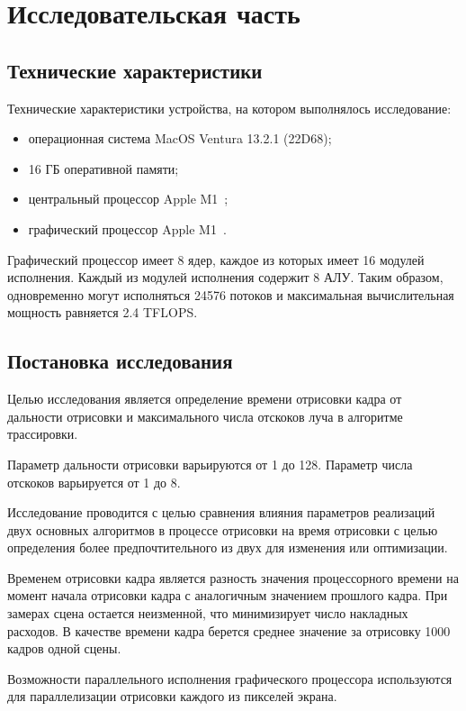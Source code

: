 \chapter{Исследовательская часть}

\section{Технические характеристики}

Технические характеристики устройства, на котором выполнялось исследование:
\begin{itemize}
    \item операционная система MacOS Ventura 13.2.1 (22D68);
    \item 16 ГБ оперативной памяти;
    \item центральный процессор Apple M1~\cite{M1};
    \item графический процессор Apple M1~\cite{M1}.
\end{itemize}

Графический процессор имеет 8 ядер, каждое из которых имеет 16 модулей 
исполнения. Каждый из модулей исполнения содержит 8 АЛУ. Таким образом, 
одновременно могут исполняться 24576 потоков и максимальная вычислительная мощность
равняется 2.4 TFLOPS.

\section{Постановка исследования}

Целью исследования является определение времени отрисовки кадра 
от дальности отрисовки и максимального числа отскоков луча в алгоритме трассировки.

Параметр дальности отрисовки варьируются от 1 до 128. Параметр числа отскоков 
варьируется от 1 до 8.

Исследование проводится с целью сравнения влияния параметров реализаций двух 
основных алгоритмов в процессе отрисовки на время отрисовки с целью определения
более предпочтительного из двух для изменения или оптимизации.

Временем отрисовки кадра является разность значения процессорного времени на момент начала 
отрисовки кадра с 
аналогичным значением прошлого кадра. При замерах сцена остается неизменной, что
минимизирует число накладных расходов. В качестве времени кадра берется
среднее значение за отрисовку 1000 кадров одной сцены.

Возможности параллельного исполнения графического процессора используются для 
параллелизации отрисовки каждого из пикселей экрана.

